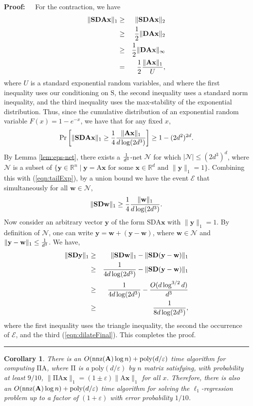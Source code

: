 \documentclass[11pt]{article}
\newtheorem{corollary}[theorem]{Corollary}
\newenvironment{proof}{\begin{trivlist} \item {\bf Proof:~~}}
  {\qed\end{trivlist}}
\newcommand{\mat}[1]{{\ensuremath{\bm{\mathrm{#1}}}}}
\def\matA{\mat{A}}
\def\matD{\mat{D}}
\def\matS{\mat{S}}
\def\w{{\mathbf{w}}}
\def\nnz{{ \rm nnz }}
\def\frac#1#2{{#1\over #2}}
\def\qed{\hfill\rule{2mm}{2mm}}
\def\x{{\mathbf x}}
\def\y{{\mathbf y}}
\newcommand{\eps}{\varepsilon}
\newcommand{\poly}{{\mathrm{poly}}}
\begin{document}
\begin{proof}
For the contraction, we have
\begin{eqnarray*}
\|\matS \matD \matA \x\|_1 & \geq & \|\matS \matD \matA \x\|_2\\
& \geq & \frac{1}{2} \|\matD \matA \x\|_2 \\
& \geq & \frac{1}{2} \|\matD \matA \x\|_{\infty}\\
& = & \frac{1}{2} \frac{\|\matA\x\|_1}{U},
\end{eqnarray*}
where $U$ is a standard exponential random variables, and 
where the first inequality uses our conditioning on $\matS$, the second inequality uses a standard norm inequality, and
the third inequality uses the max-stability of the exponential distribution. Thus, since the cumulative distribution
of an exponential random variable $F(x) = 1-e^{-x}$, we have that for any fixed $x$,
\begin{eqnarray}\label{eqn:tailExp}
\Pr \left [\|\matS \matD \matA \x\|_1 \geq \frac{1}{4} \frac{\|\matA \x\|_1}{d \log (2d^3)} \right ] \geq 1- (2d^2)^{2d}. 
\end{eqnarray} 
By Lemma \ref{lem:eps-net}, there exists a $\frac{1}{d^3}$-net $\mathcal{N}$ for which $|\mathcal{N}| \leq (2d^3)^d$,
where $\mathcal{N}$ is a subset of 
$\{\y \in \mathbb{R}^n \mid \y = \matA \x \textrm{ for some } \x \in \mathbb{R}^d \textrm{ and }
\|\y\|_1 = 1\}$. Combining this with (\ref{eqn:tailExp}), by a union bound we have the event $\mathcal{E}$ that 
simultaneously for all 
$\w \in \mathcal{N}$, 
$$\|\matS \matD \w\|_1 \geq \frac{1}{4} \frac{\|\w\|_1}{d \log (2d^3)}.$$
Now consider an arbitrary vector $\y$ of the form $\matS \matD \matA \x$ 
with $\|\y\|_1 = 1$. By definition of $\mathcal{N}$, one can
write $\y = \w + (\y-\w)$, where $\w \in \mathcal{N}$ and $\|\y-\w\|_1 \leq \frac{1}{d^3}$. We have,
\begin{eqnarray*}
\|\matS \matD \y\|_1 & \geq & \|\matS \matD \w\|_1 - \|\matS \matD(\y-\w)\|_1\\
& \geq & \frac{1}{4 d \log(2d^3)} - \|\matS\matD(\y-\w)\|_1\\
&  \geq & \frac{1}{4 d \log(2d^3)} - \frac{O(d \log^{3/2} d)}{d^3}\\
& \geq & \frac{1}{8 d \log(2d^3)},
\end{eqnarray*}
where the first inequality uses the triangle inequality, the second the occurrence of $\mathcal{E}$, and the third
(\ref{eqn:dilateFinal}). This completes the proof. 
\end{proof}
\begin{corollary}\label{cor:second}
There is an $O(\nnz(\matA)\log n) + \poly(d/\eps)$ time algorithm for computing $\mat\Pi \matA$, where 
$\mat\Pi$ is a $\poly(d/\eps)$
by $n$ matrix satisfying, with probability at least $9/10$, 
$\|\mat\Pi \matA \x\|_1 = (1 \pm \eps) \|\matA \x\|_1$ for all $x$. Therefore, there is also
an $O(\nnz(\matA) \log n) + \poly(d/\eps)$ time algorithm for solving the $\ell_1$-regression problem
up to a factor of $(1+\eps)$ with error probability $1/10$. 
\end{corollary}
\end{document}
